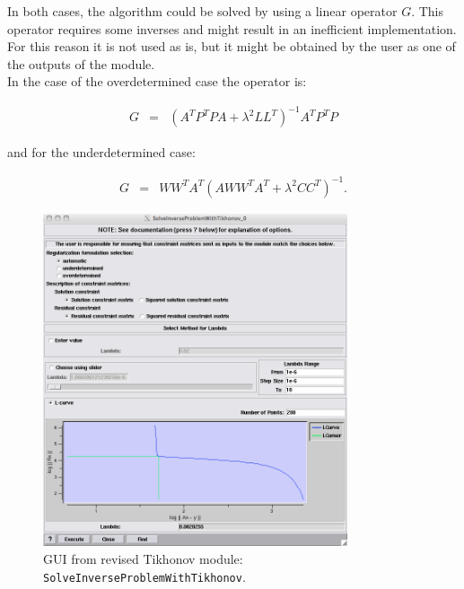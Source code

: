 \documentclass[fleqn,11pt,openany]{book}
\begin{document}
\noindent In both cases, the algorithm could be solved by using a linear operator $G$. This operator requires some inverses and might result in an inefficient implementation. 
For this reason it is not used as is, but it might be obtained by the user as one of the outputs of the module.\\
In the case of the overdetermined case the operator is:
\begin{center}
\begin{eqnarray}
   G &=& (A^{T} P^{T} P A + \lambda^{2} L L^{T})^{-1} A^{T} P^{T} P
\label{tik_problem_overdet_invop}
\end{eqnarray}
\end{center}
\noindent and for the underdetermined case:
\begin{center}
\begin{eqnarray}
   G &=& W W ^{T} A^{T} (A W W^{T} A^{T} + \lambda^{2} C C^{T})^{-1} .
\label{tik_problem_underdet_invop}
\end{eqnarray}
\end{center}


\begin{figure}[H]
\begin{center}
\includegraphics[width=0.8\textwidth]{ECGToolkitGuide_figures/tik2.png}
\caption{GUI from revised Tikhonov module: {\tt SolveInverseProblemWithTikhonov}.}
\label{tik_module_gui}
\end{center}
\end{figure}
\end{document}
